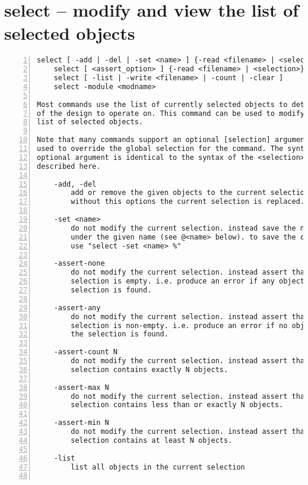 \section{select -- modify and view the list of selected objects}
\label{cmd:select}
\begin{lstlisting}[numbers=left,frame=single]
    select [ -add | -del | -set <name> ] {-read <filename> | <selection>}
    select [ <assert_option> ] {-read <filename> | <selection>}
    select [ -list | -write <filename> | -count | -clear ]
    select -module <modname>

Most commands use the list of currently selected objects to determine which part
of the design to operate on. This command can be used to modify and view this
list of selected objects.

Note that many commands support an optional [selection] argument that can be
used to override the global selection for the command. The syntax of this
optional argument is identical to the syntax of the <selection> argument
described here.

    -add, -del
        add or remove the given objects to the current selection.
        without this options the current selection is replaced.

    -set <name>
        do not modify the current selection. instead save the new selection
        under the given name (see @<name> below). to save the current selection,
        use "select -set <name> %"

    -assert-none
        do not modify the current selection. instead assert that the given
        selection is empty. i.e. produce an error if any object matching the
        selection is found.

    -assert-any
        do not modify the current selection. instead assert that the given
        selection is non-empty. i.e. produce an error if no object matching
        the selection is found.

    -assert-count N
        do not modify the current selection. instead assert that the given
        selection contains exactly N objects.

    -assert-max N
        do not modify the current selection. instead assert that the given
        selection contains less than or exactly N objects.

    -assert-min N
        do not modify the current selection. instead assert that the given
        selection contains at least N objects.

    -list
        list all objects in the current selection


\end{lstlisting}

